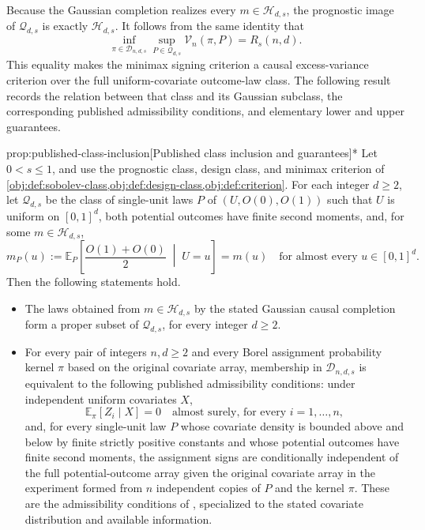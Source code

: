 \documentclass[11pt]{article}
\begin{document}
Because the Gaussian completion realizes every \(m\in\mathcal H_{d,s}\), the prognostic image of \(\mathcal Q_{d,s}\) is exactly \(\mathcal H_{d,s}\). It follows from the same identity that
\[
\inf_{\pi\in\mathcal D_{n,d,s}}
\sup_{P\in\mathcal Q_{d,s}}
\mathcal V_n(\pi,P)
=
R_s(n,d).
\]
This equality makes the minimax signing criterion a causal excess-variance criterion over the full uniform-covariate outcome-law class. The following result records the relation between that class and its Gaussian subclass, the corresponding published admissibility conditions, and elementary lower and upper guarantees.

\begin{propositionv}{prop:published-class-inclusion}[Published class inclusion and guarantees]*
Let \(0<s\leq1\), and use the prognostic class, design class, and minimax criterion of \cref{obj:def:sobolev-class,obj:def:design-class,obj:def:criterion}. For each integer \(d\geq2\), let \(\mathcal Q_{d,s}\) be the class of single-unit laws \(P\) of \((U,O(0),O(1))\) such that \(U\) is uniform on \([0,1]^d\), both potential outcomes have finite second moments, and, for some \(m\in\mathcal H_{d,s}\),
\[
m_P(u):=\mathbb E_P\!\left[\frac{O(1)+O(0)}2\;\middle|\;U=u\right]
=m(u)
\quad\text{for almost every }u\in[0,1]^d.
\]
Then the following statements hold.
\begin{itemize}
\item The laws obtained from \(m\in\mathcal H_{d,s}\) by the stated Gaussian causal completion form a proper subset of \(\mathcal Q_{d,s}\), for every integer \(d\geq2\).

\item For every pair of integers \(n,d\geq2\) and every Borel assignment probability kernel \(\pi\) based on the original covariate array, membership in \(\mathcal D_{n,d,s}\) is equivalent to the following published admissibility conditions: under independent uniform covariates \(X\),
\[
\mathbb E_\pi[Z_i\mid X]=0
\quad\text{almost surely, for every }i=1,\ldots,n,
\]
and, for every single-unit law \(P\) whose covariate density is bounded above and below by finite strictly positive constants and whose potential outcomes have finite second moments, the assignment signs are conditionally independent of the full potential-outcome array given the original covariate array in the experiment formed from \(n\) independent copies of \(P\) and the kernel \(\pi\). These are the admissibility conditions of \citet[Assumption 2.1 and Definition 2.2]{Cytrynbaum2026Limits}, specialized to the stated covariate distribution and available information.


\end{itemize}
\end{propositionv}
\end{document}
